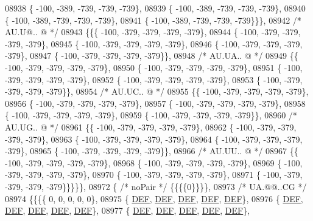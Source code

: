 \begin{DoxyCode}
08938 \{ -100, -389, -739, -739, -739\},
08939 \{ -100, -389, -739, -739, -739\},
08940 \{ -100, -389, -739, -739, -739\},
08941 \{ -100, -389, -739, -739, -739\}\}\},
08942 \textcolor{comment}{/* AU.U@.. @ */}
08943 \{\{\{ -100, -379, -379, -379, -379\},
08944 \{ -100, -379, -379, -379, -379\},
08945 \{ -100, -379, -379, -379, -379\},
08946 \{ -100, -379, -379, -379, -379\},
08947 \{ -100, -379, -379, -379, -379\}\},
08948 \textcolor{comment}{/* AU.UA.. @ */}
08949 \{\{ -100, -379, -379, -379, -379\},
08950 \{ -100, -379, -379, -379, -379\},
08951 \{ -100, -379, -379, -379, -379\},
08952 \{ -100, -379, -379, -379, -379\},
08953 \{ -100, -379, -379, -379, -379\}\},
08954 \textcolor{comment}{/* AU.UC.. @ */}
08955 \{\{ -100, -379, -379, -379, -379\},
08956 \{ -100, -379, -379, -379, -379\},
08957 \{ -100, -379, -379, -379, -379\},
08958 \{ -100, -379, -379, -379, -379\},
08959 \{ -100, -379, -379, -379, -379\}\},
08960 \textcolor{comment}{/* AU.UG.. @ */}
08961 \{\{ -100, -379, -379, -379, -379\},
08962 \{ -100, -379, -379, -379, -379\},
08963 \{ -100, -379, -379, -379, -379\},
08964 \{ -100, -379, -379, -379, -379\},
08965 \{ -100, -379, -379, -379, -379\}\},
08966 \textcolor{comment}{/* AU.UU.. @ */}
08967 \{\{ -100, -379, -379, -379, -379\},
08968 \{ -100, -379, -379, -379, -379\},
08969 \{ -100, -379, -379, -379, -379\},
08970 \{ -100, -379, -379, -379, -379\},
08971 \{ -100, -379, -379, -379, -379\}\}\}\}\},
08972 \{ \textcolor{comment}{/* noPair */} \{\{\{\{0\}\}\}\},
08973 \textcolor{comment}{/* UA.@@..CG */}
08974 \{\{\{\{    0,    0,    0,    0,    0\},
08975 \{  \mbox{\hyperlink{1_88_84__epars_8h_a397419fc12b37ed479c8abb9d444d843}{DEF}},  \mbox{\hyperlink{1_88_84__epars_8h_a397419fc12b37ed479c8abb9d444d843}{DEF}},  \mbox{\hyperlink{1_88_84__epars_8h_a397419fc12b37ed479c8abb9d444d843}{DEF}},  \mbox{\hyperlink{1_88_84__epars_8h_a397419fc12b37ed479c8abb9d444d843}{DEF}},  \mbox{\hyperlink{1_88_84__epars_8h_a397419fc12b37ed479c8abb9d444d843}{DEF}}\},
08976 \{  \mbox{\hyperlink{1_88_84__epars_8h_a397419fc12b37ed479c8abb9d444d843}{DEF}},  \mbox{\hyperlink{1_88_84__epars_8h_a397419fc12b37ed479c8abb9d444d843}{DEF}},  \mbox{\hyperlink{1_88_84__epars_8h_a397419fc12b37ed479c8abb9d444d843}{DEF}},  \mbox{\hyperlink{1_88_84__epars_8h_a397419fc12b37ed479c8abb9d444d843}{DEF}},  \mbox{\hyperlink{1_88_84__epars_8h_a397419fc12b37ed479c8abb9d444d843}{DEF}}\},
08977 \{  \mbox{\hyperlink{1_88_84__epars_8h_a397419fc12b37ed479c8abb9d444d843}{DEF}},  \mbox{\hyperlink{1_88_84__epars_8h_a397419fc12b37ed479c8abb9d444d843}{DEF}},  \mbox{\hyperlink{1_88_84__epars_8h_a397419fc12b37ed479c8abb9d444d843}{DEF}},  \mbox{\hyperlink{1_88_84__epars_8h_a397419fc12b37ed479c8abb9d444d843}{DEF}},  \mbox{\hyperlink{1_88_84__epars_8h_a397419fc12b37ed479c8abb9d444d843}{DEF}}\},

\end{DoxyCode}

